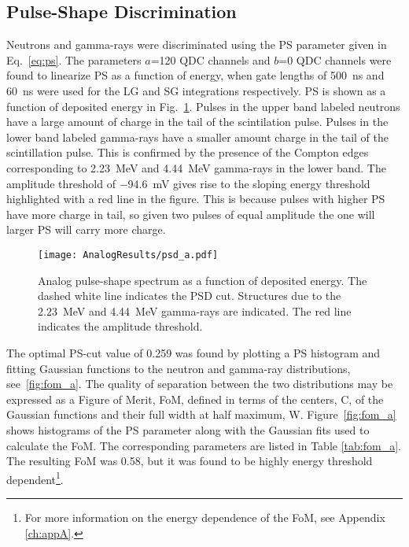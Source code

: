 \documentclass[main.tex]{subfiles}
\begin{document}
\subsection{Pulse-Shape Discrimination}
Neutrons and gamma-rays were discriminated using the PS parameter given in Eq.~\ref{eq:ps}. The parameters $a$=120 QDC channels and $b$=0 QDC channels were found to linearize PS as a function of energy, when gate lengths of \SI{500}{\ns} and \SI{60}{ns} were used for the LG and SG integrations respectively.
PS is shown as a function of deposited energy in Fig.~\ref{fig:psd_a}. Pulses in the upper band labeled neutrons have a large amount of charge in the tail of the scintilation pulse. Pulses in the lower band labeled gamma-rays have a smaller amount charge in the tail of the scintillation pulse. 
This is confirmed by the presence of the Compton edges corresponding to \SI{2.23}{MeV} and \SI{4.44}{MeV} gamma-rays in the lower band. The amplitude threshold of \SI{-94.6}{mV} gives rise to the sloping energy threshold highlighted with a red line in the figure. This is because pulses with higher PS  have more charge in tail, so given two pulses of equal amplitude the one will larger PS will carry more charge.
\begin{figure}[ht]
    \centering
        \texttt{[image: AnalogResults/psd\_a.pdf]}
        \caption[Analog pulse-shape spectrum as a function of deposited energy.]{Analog pulse-shape spectrum as a function of deposited energy. The dashed white line indicates the PSD cut. Structures due to the \SI{2.23}{MeV} and \SI{4.44}{MeV} gamma-rays are indicated. The red line indicates the amplitude threshold.}
        \label{fig:psd_a}
\end{figure}

The optimal PS-cut value of 0.259 was found by plotting a PS histogram and fitting Gaussian functions to the neutron and gamma-ray distributions, see~\ref{fig:fom_a}. The quality of separation between the two distributions may be expressed as a Figure of Merit, FoM, defined in terms of the centers, C, of the Gaussian functions and their full width at half maximum, W. Figure~\ref{fig:fom_a} shows histograms of the PS parameter along with the Gaussian fits used to calculate the FoM. The corresponding parameters are listed in Table \ref{tab:fom_a}. The resulting FoM was 0.58, but it was found to be highly energy threshold dependent\footnote{For more information on the energy dependence of the FoM, see Appendix \ref{ch:appA}.}. 
\end{document}

